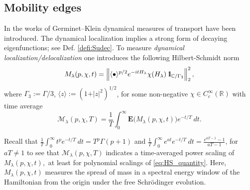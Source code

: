\documentclass[reqno,12pt,letterpaper]{amsart}
\newcommand{\RR}{{\mathbb R}}
\newcommand{\CC}{{\mathbb C}}
\numberwithin{equation}{section}
\def\indic{\operatorname{1\hskip-2.75pt\relax l}}
\begin{document}
\subsection{Mobility edges}
In the works of Germinet--Klein \cite{GK01,GK02,GK04} dynamical measures of transport have been introduced. The dynamical localization implies a strong form of decaying eigenfunctions; see Def. \ref{defi:Sudec}. 
To measure \emph{dynamical localization/delocalization} one introduces the following Hilbert-Schmidt norm
\begin{equation}
\label{eq:HS_quantity}
  M_{\lambda}(p, \chi, t) = \left\lVert \langle \bullet \rangle^{p/2} e^{-itH_{\lambda}} \chi(H_{\lambda})\indic_{\CC/\Gamma_3} \right\rVert_2^2,
  \end{equation}
  where $\Gamma_3:=\Gamma/3$, $\langle z \rangle:=(1+\vert z \vert^2)^{1/2}$, for some non-negative $\chi \in C_c^{\infty}(\RR)$ with time average
\[ \mathcal M_{\lambda}(p,\chi,T) = \frac{1}{T} \int_0^{\infty} \mathbf E \Big(M_{\lambda}(p, \chi, t)\Big) e^{-t/T} \ dt.\]

Recall that {$\frac{1}{T} \int_0^{\infty} t^p e^{-t/T} \ dt = T^p \Gamma(p+1)$ and $\frac{1}{T} \int_0^{\infty} e^{at} e^{-t/T} \ dt = \frac{e^{a T-1}-1}{a T-1}$, for $aT\neq 1$} to see that $\mathcal M_{\lambda}(p,\chi,T)$ indicates a time-averaged power scaling of $M_{\lambda}(p, \chi, t),${ at least for polynomial scalings of \eqref{eq:HS_quantity}.} Here, $ M_{\lambda}(p, \chi, t) $ measures the spread of mass in a spectral energy window of the Hamiltonian from the origin under the free Schr\"odinger evolution. 
\end{document}

